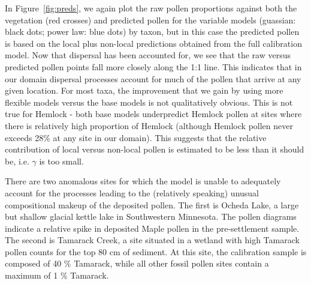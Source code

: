 \documentclass[12pt]{article}
\begin{document}
In Figure~\ref{fig:preds}, we again plot the raw pollen proportions
against both the vegetation (red crosses) and predicted pollen for the
variable models (guassian: black dots; power law: blue dots) by taxon,
but in this case the predicted pollen is based on the local plus
non-local predictions obtained from the full calibration model. Now
that dispersal has been accounted for, we see that the raw versus
predicted pollen points fall more closely along the 1:1 line. This
indicates that in our domain dispersal processes account for much of
the pollen that arrive at any given location. For most taxa, the
improvement that we gain by using more flexible models versus the base
models is not qualitatively obvious. This is not true for Hemlock -
both base models underpredict Hemlock pollen at sites where there is
relatively high proportion of Hemlock (although Hemlock pollen never
exceeds 28\% at any site in our domain). This suggests that the
relative contribution of local versus non-local pollen is estimated to
be less than it should be, i.e. $\gamma$ is too small.

There are two anomalous sites for which the model is unable to
adequately account for the processes leading to the (relatively
speaking) unusual compositional makeup of the deposited pollen. The
first is Ocheda Lake, a large but shallow glacial kettle lake in
Southwestern Minnesota. The pollen diagrams indicate a relative spike
in deposited Maple pollen in the pre-settlement sample. The second is
Tamarack Creek, a site situated in a wetland with high Tamarack pollen
counts for the top 80 cm of sediment. At this site, the calibration
sample is composed of 40 \% Tamarack, while all other fossil pollen
sites contain a maximum of 1 \% Tamarack.
\end{document}
